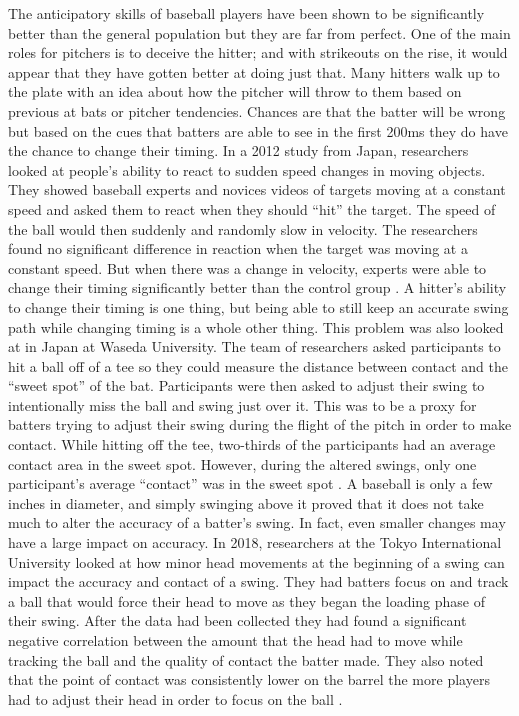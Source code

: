 \documentclass{article}
\begin{document}
\begin{doublespace}
The anticipatory skills of baseball players have been shown to be significantly better than the general population but they are far from perfect. One of the main roles for pitchers is to deceive the hitter; and with strikeouts on the rise, it would appear that they have gotten better at doing just that. Many hitters walk up to the plate with an idea about how the pitcher will throw to them based on previous at bats or pitcher tendencies. Chances are that the batter will be wrong but based on the cues that batters are able to see in the first 200ms they do have the chance to change their timing. In a 2012 study from Japan, researchers looked at people’s ability to react to sudden speed changes in moving objects. They showed baseball experts and novices videos of targets moving at a constant speed and asked them to react when they should “hit” the target. The speed of the ball would then suddenly and randomly slow in velocity. The researchers found no significant difference in reaction when the target was moving at a constant speed. But when there was a change in velocity, experts were able to change their timing significantly better than the control group \citep{Nakamoto}. A hitter’s ability to change their timing is one thing, but being able to still keep an accurate swing path while changing timing is a whole other thing. This problem was also looked at in Japan at Waseda University. The team of researchers asked participants to hit a ball off of a tee so they could measure the distance between contact and the “sweet spot” of the bat. Participants were then asked to adjust their swing to intentionally miss the ball and swing just over it. This was to be a proxy for batters trying to adjust their swing during the flight of the pitch in order to make contact. While hitting off the tee, two-thirds of the participants had an average contact area in the sweet spot. However, during the altered swings, only one participant’s average “contact” was in the sweet spot \citep{Higuchi}.  A baseball is only a few inches in diameter, and simply swinging above it proved that it does not take much to alter the accuracy of a batter’s swing. In fact, even smaller changes may have a large impact on accuracy. In 2018, researchers at the Tokyo International University looked at how minor head movements at the beginning of a swing can impact the accuracy and contact of a swing. They had batters focus on and track a ball that would force their head to move as they began the loading phase of their swing. After the data had been collected they had found a significant negative correlation between the amount that the head had to move while tracking the ball and the quality of contact the batter made. They also noted that the point of contact was consistently lower on the barrel the more players had to adjust their head in order to focus on the ball \citep{Akaike}.  

\end{doublespace}
\end{document}
